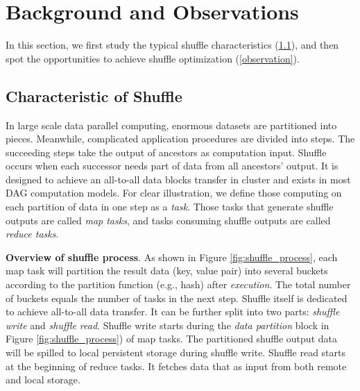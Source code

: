 \section{Background and Observations}

In this section, we first study the typical shuffle characteristics (\ref{shuffle pattern}), and then spot the opportunities to achieve shuffle optimization (\ref{observation}).
\subsection{Characteristic of Shuffle} \label{shuffle pattern}

In large scale data parallel computing, enormous datasets are partitioned into pieces.
Meanwhile, complicated application procedures are divided into steps. The succeeding steps take the output of ancestors as computation input. Shuffle occurs when each successor needs
part of data from all ancestors' output. It is designed to achieve an all-to-all data blocks transfer in cluster and exists in most DAG computation models.
For clear illustration, we define those computing on each partition of data in one step as a \textit{task}.
Those tasks that generate shuffle outputs are called \textit{map tasks}, and tasks consuming shuffle outputs are called \textit{reduce tasks}.

\textbf{Overview of shuffle process}. As shown in Figure \ref{fig:shuffle_process}, each map task will partition the result data (key, value pair) into several buckets according to the partition function (e.g., hash) after \textit{execution}. The total number of buckets equals the number of tasks in the next step.
Shuffle itself is dedicated to achieve all-to-all data transfer.
It can be further split into two parts: \textit{shuffle write} and \textit{shuffle read}. Shuffle write starts during the \textit{data partition} block in Figure \ref{fig:shuffle_process}) of map tasks.
The partitioned shuffle output data will be spilled to local persistent storage during shuffle write.
Shuffle read starts at the beginning of reduce tasks. It fetches data that as input from both remote and local storage.

